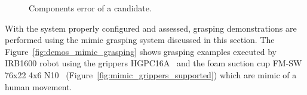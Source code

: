\begin{figure}[h!]
{\begin{tcolorbox}
\begin{subfigure}[c]{.485\textwidth}
     \end{subfigure}
    \end{tcolorbox}
    \caption{Components error of a candidate.}
    \label{fig:mimic_grapsing_final_error}
  }%
\end{figure}


With the system properly configured and assessed, grasping demonstrations are performed using the mimic grasping system discussed in this section. The Figure~\ref{fig:demos_mimic_grasping} shows grasping examples executed by IRB1600 robot using the grippers HGPC16A~\cite{festo_2f} and the foam suction cup FM-SW 76x22 4x6 N10~\cite{schmalz_cup} (Figure~\ref{fig:mimic_grippers_supported}) which are mimic of a human movement.




